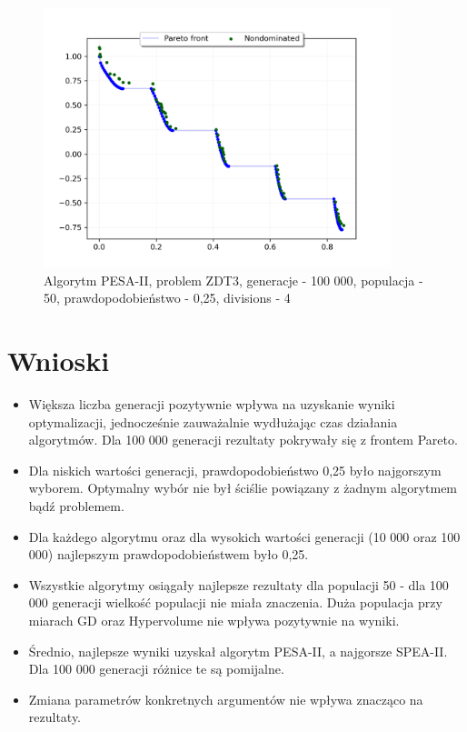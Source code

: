 \documentclass{classrep}
\begin{document}
\begin{figure}[H]
    \centering
    \includegraphics[width=0.9\textwidth]{img2/PESAII_ZDT3_g10000_p50_r0,25_e4.png}
    \caption{Algorytm PESA-II, problem ZDT3, \newline generacje - 100 000, populacja - 50, prawdopodobieństwo - 0,25, divisions - 4}
\end{figure}


\section{Wnioski}

\begin{itemize}
    \item Większa liczba generacji pozytywnie wpływa na uzyskanie wyniki optymalizacji, jednocześnie zauważalnie wydłużając czas działania algorytmów. Dla 100 000 generacji rezultaty pokrywały się z frontem Pareto.
    \item Dla niskich wartości generacji, prawdopodobieństwo 0,25 było najgorszym wyborem. Optymalny wybór nie był ściślie powiązany z żadnym algorytmem bądź problemem.
    \item Dla każdego algorytmu oraz dla wysokich wartości generacji (10 000 oraz 100 000) najlepszym prawdopodobieństwem było 0,25.
    \item Wszystkie algorytmy osiągały najlepsze rezultaty dla populacji 50 - dla 100 000 generacji wielkość populacji nie miała znaczenia. Duża populacja przy miarach GD oraz Hypervolume nie wpływa pozytywnie na wyniki.
    \item Średnio, najlepsze wyniki uzyskał algorytm PESA-II, a najgorsze SPEA-II. Dla 100 000 generacji różnice te są pomijalne.
    \item Zmiana parametrów konkretnych argumentów nie wpływa znacząco na rezultaty.

\end{itemize}

\newpage

\nocite{*}


\end{document}
